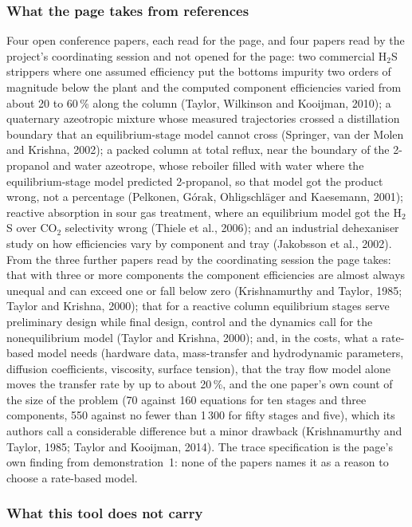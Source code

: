 \documentclass[11pt,a4paper]{article}
\begin{document}
\subsubsection*{What the page takes from references}

Four open conference papers, each read for the page, and four papers read by
the project's coordinating session and not opened for the page: two commercial H$_2$S strippers where one
assumed efficiency put the bottoms impurity two orders of magnitude below the
plant and the computed component efficiencies varied from about 20 to 60\,\%
along the column (Taylor, Wilkinson and Kooijman, 2010); a quaternary
azeotropic mixture whose measured trajectories crossed a distillation boundary
that an equilibrium-stage model cannot cross (Springer, van der Molen and
Krishna, 2002); a packed column at total reflux, near the boundary of the
2-propanol and water azeotrope, whose reboiler filled with water where the
equilibrium-stage model predicted 2-propanol, so that model got the product
wrong, not a percentage (Pelkonen, G\'orak, Ohligschl\"ager and Kaesemann,
2001); reactive absorption in sour gas treatment,
where an equilibrium model got the H$_2$S over CO$_2$ selectivity wrong
(Thiele et al., 2006); and an industrial dehexaniser study on how efficiencies
vary by component and tray (Jakobsson et al., 2002).  From the three further papers
read by the coordinating session the page takes: that with three or more
components the component efficiencies are almost always unequal and can exceed
one or fall below zero (Krishnamurthy and Taylor, 1985; Taylor and Krishna,
2000); that for a reactive column equilibrium stages serve preliminary design
while final design, control and the dynamics call for the nonequilibrium model
(Taylor and Krishna, 2000); and, in the costs, what a rate-based model needs
(hardware data, mass-transfer and hydrodynamic parameters, diffusion
coefficients, viscosity, surface tension), that the tray flow model alone moves
the transfer rate by up to about 20\,\%, and the one paper's own count of the
size of the problem (70 against 160 equations for ten stages and three
components, 550 against no fewer than 1\,300 for fifty stages and five), which
its authors call a considerable difference but a minor drawback (Krishnamurthy
and Taylor, 1985; Taylor and Kooijman, 2014).  The trace specification is the
page's own finding from demonstration~1: none of the papers names it as a
reason to choose a rate-based model.

\subsubsection*{What this tool does not carry}
\end{document}
